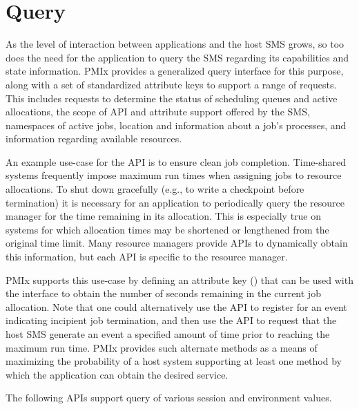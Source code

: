 \section{Query}
\label{chap:api_proc_mgmt:query}

As the level of interaction between applications and the host \ac{SMS} grows, so too does the need for the application to query the \ac{SMS} regarding its capabilities and state information. \ac{PMIx} provides a generalized query interface for this purpose, along with a set of standardized attribute keys to support a range of requests. This includes requests to determine the status of scheduling queues and active allocations, the scope of \ac{API} and attribute support offered by the \ac{SMS}, namespaces of active jobs, location and information about a job's processes, and information regarding available resources.

An example use-case for the  \ac{API} is to ensure clean job completion. Time-shared systems frequently impose maximum run times when assigning jobs to resource allocations. To shut down gracefully (e.g., to write a checkpoint before termination) it is necessary for an application to periodically query the resource manager for the time remaining in its allocation. This is especially true on systems for which allocation times may be shortened or lengthened from the original time limit. Many resource managers provide \acp{API} to dynamically obtain this information, but each \ac{API} is specific to the resource manager.

\ac{PMIx} supports this use-case by defining an attribute key () that can be used with the  interface to obtain the number of seconds remaining in the current job allocation. Note that one could alternatively use the  \ac{API} to register for an event indicating incipient job termination, and then use the  \ac{API} to request that the host \ac{SMS} generate an event a specified amount of time prior to reaching the maximum run time. \ac{PMIx} provides such alternate methods as a means of maximizing the probability of a host system supporting at least one method by which the application can obtain the desired service.

The following \acp{API} support query of various session and environment values.


